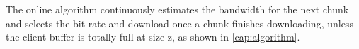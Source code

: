 

The online algorithm continuously estimates the bandwidth for the next
chunk and selects the bit rate and download once a chunk finishes downloading, unless the client
buffer is totally full at size z, as shown in
\autoref{cap:algorithm}. 







